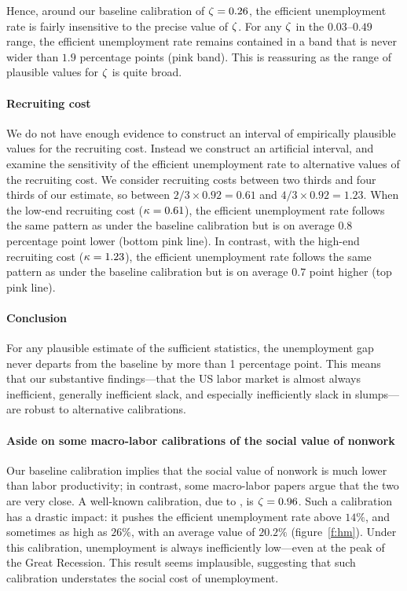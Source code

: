 \documentclass[letterpaper,12pt,leqno]{article}
\begin{document}
Hence, around our baseline calibration of $\zeta=0.26$, the efficient unemployment rate is fairly insensitive to the precise value of $\zeta$. For any $\zeta$ in the $0.03$--$0.49$ range, the efficient unemployment rate remains contained in a band that is never wider than $1.9$ percentage points (pink band). This is reassuring as the range of plausible values for $\zeta$ is quite broad.

\paragraph{Recruiting cost} We do not have enough evidence to construct an interval of empirically plausible values for the recruiting cost. Instead we construct an artificial interval, and examine the sensitivity of the efficient unemployment rate to alternative values of the recruiting cost. We consider recruiting costs between two thirds and four thirds of our estimate, so between $2/3\times 0.92 = 0.61$ and $4/3\times 0.92 = 1.23$. When the low-end recruiting cost ($\kappa=0.61$), the efficient unemployment rate follows the same pattern as under the baseline calibration but is on average $0.8$ percentage point lower (bottom pink line). In contrast, with the high-end recruiting cost ($\kappa=1.23$), the efficient unemployment rate follows the same pattern as under the baseline calibration but is on average $0.7$ point higher (top pink line).

\paragraph{Conclusion} For any plausible estimate of the sufficient statistics, the unemployment gap never departs from the baseline by more than 1 percentage point. This means that our substantive findings---that the US labor market is almost always inefficient, generally inefficient slack, and especially inefficiently slack in slumps---are robust to alternative calibrations.

\paragraph{Aside on some macro-labor calibrations of the social value of nonwork} Our baseline calibration implies that the social value of nonwork is much lower than labor productivity; in contrast, some macro-labor papers argue that the two are very close. A well-known calibration, due to , is $\zeta= 0.96$. Such a calibration has a drastic impact: it pushes the efficient unemployment rate above $14\%$, and sometimes as high as $26\%$, with an average value of $20.2\%$ (figure~\ref{f:hm}). Under this calibration, unemployment is always inefficiently low---even at the peak of the Great Recession. This result seems implausible, suggesting that such calibration understates the social cost of unemployment.
\end{document}
